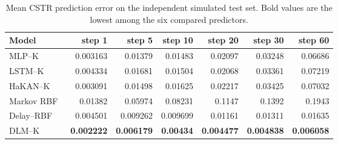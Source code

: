\begin{table}[pos=!htbp]
\caption{Mean CSTR prediction error on the independent simulated test set. Bold values are the lowest among the six compared predictors.}
\label{tab:primary}
\centering\small
\setlength{\tabcolsep}{5pt}
\begin{tabular}{@{}lrrrrrr@{}}\toprule
Model & step 1 & step 5 & step 10 & step 20 & step 30 & step 60 \\\midrule
MLP--K~\cite{Lusch2018} & 0.003163 & 0.01379 & 0.01483 & 0.02097 & 0.03248 & 0.06686 \\
LSTM--K~\cite{Han2024DRKO} & 0.004334 & 0.01681 & 0.01504 & 0.02068 & 0.03361 & 0.07219 \\
HaKAN--K~\cite{Hasan2026} & 0.003091 & 0.01498 & 0.01625 & 0.02217 & 0.03425 & 0.07032 \\
Markov RBF~\cite{Williams2015,Korda2018} & 0.01382 & 0.05974 & 0.08231 & 0.1147 & 0.1392 & 0.1943 \\
Delay--RBF~\cite{Pan2020TimeDelay} & 0.004501 & 0.009262 & 0.009699 & 0.01161 & 0.01311 & 0.01635 \\
DLM--K & \textbf{0.002222} & \textbf{0.006179} & \textbf{0.00434} & \textbf{0.004477} & \textbf{0.004838} & \textbf{0.006058} \\
\bottomrule\end{tabular}
\end{table}

